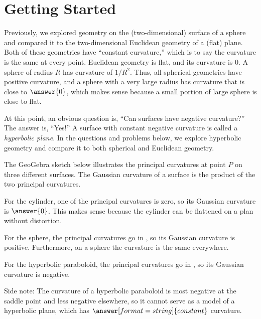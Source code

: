 \documentclass{ximera}
\begin{document}
\section*{Getting Started}
Previously, we explored geometry on the (two-dimensional) surface of a sphere and compared it to the two-dimensional Euclidean geometry of a (flat) plane.  Both of these geometries have ``constant curvature,'' which is to say the curvature is the same at every point.  Euclidean geometry is flat, and its curvature is 0.  A sphere of radius $R$ has curvature of $1/R^2$.  Thus, all spherical geometries have positive curvature, and a sphere with a very large radius has curvature that is close to $\answer{0}$, which makes sense because a small portion of large sphere is close to flat.  

At this point, an obvious question is, ``Can surfaces have negative curvature?''  The answer is, ``Yes!''  A surface with constant negative curvature is called a \emph{hyperbolic plane}.  In the questions and problems below, we explore hyperbolic geometry and compare it to both spherical and Euclidean geometry.  



\begin{problem}
The GeoGebra sketch below illustrates the principal curvatures at point $P$ on three different surfaces.  The Gaussian curvature of a surface is the product of the two principal curvatures.  
\begin{center}
\end{center}

For the cylinder, one of the principal curvatures is zero, so its Gaussian curvature is $\answer{0}$.  This makes sense because the cylinder can be flattened on a plan without distortion.  

For the sphere, the principal curvatures go in , so its Gaussian curvature is positive.  Furthermore, on a sphere the curvature is the same everywhere.  
 
For the hyperbolic paraboloid, the principal curvatures go in , so its Gaussian curvature is 
negative.  

Side note: The curvature of a hyperbolic paraboloid is most negative at the saddle point and less negative elsewhere, so it cannot serve as a model of a hyperbolic plane, which has $\answer[format=string]{constant}$ curvature.  
\end{problem}
\end{document}
